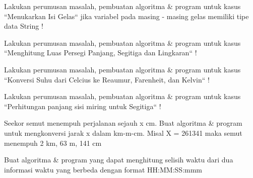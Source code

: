 \begin{pemrograman}
Lakukan perumusan masalah, pembuatan algoritma \& program untuk kasus ``Menukarkan Isi Gelas`` jika variabel pada masing - masing gelas memiliki tipe data String !
\end{pemrograman}

\begin{pemrograman}
Lakukan perumusan masalah, pembuatan algoritma \& program untuk kasus ``Menghitung Luas Persegi Panjang, Segitiga dan Lingkaran`` !
\end{pemrograman}

\begin{pemrograman}
Lakukan perumusan masalah, pembuatan algoritma \& program untuk kasus ``Konversi Suhu dari Celcius ke Reaumur, Farenheit, dan Kelvin`` !
\end{pemrograman}

\begin{pemrograman}
Lakukan perumusan masalah, pembuatan algoritma \& program untuk kasus ``Perhitungan panjang sisi miring untuk Segitiga`` !
\end{pemrograman}

\begin{pemrograman}
Seekor semut menempuh perjalanan sejauh x cm. Buat algoritma \& program untuk mengkonversi jarak x dalam km-m-cm. Misal X = 261341
maka semut menempuh 2 km, 63 m, 141 cm
\end{pemrograman}

\begin{pemrograman}
Buat algoritma \& program yang dapat menghitung selisih waktu dari dua informasi waktu yang berbeda dengan format HH:MM:SS:mmm
\end{pemrograman}




